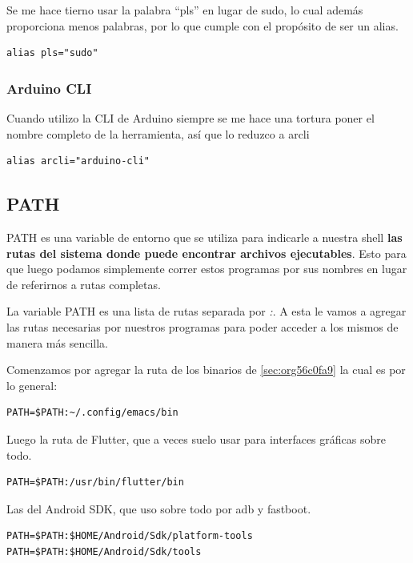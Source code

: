 \documentclass[11pt]{article}
\begin{document}
Se me hace tierno usar la palabra ``pls'' en lugar de sudo, lo cual además proporciona menos palabras, por lo que cumple con el propósito de ser un alias.

\begin{verbatim}
alias pls="sudo"
\end{verbatim}
\subsubsection{Arduino CLI}
\label{sec:org46fb6d8}

Cuando utilizo la CLI de Arduino siempre se me hace una tortura poner el nombre completo de la herramienta, así que lo reduzco a arcli

\begin{verbatim}
alias arcli="arduino-cli"

\end{verbatim}
\subsection{PATH}
\label{sec:org67d6854}

PATH es una variable de entorno que se utiliza para indicarle a nuestra shell \textbf{las rutas del sistema donde puede encontrar archivos ejecutables}. Esto para que luego podamos simplemente correr estos programas por sus nombres en lugar de referirnos a rutas completas.

La variable PATH es una lista de rutas separada por \emph{:}. A esta le vamos a agregar las rutas necesarias por nuestros programas para poder acceder a los mismos de manera más sencilla.

Comenzamos por agregar la ruta de los binarios de \ref{sec:org56c0fa9} la cual es por lo general:

\begin{verbatim}
PATH=$PATH:~/.config/emacs/bin
\end{verbatim}

Luego la ruta de Flutter, que a veces suelo usar para interfaces gráficas sobre todo.

\begin{verbatim}
PATH=$PATH:/usr/bin/flutter/bin
\end{verbatim}

Las del Android SDK, que uso sobre todo por adb y fastboot.

\begin{verbatim}
PATH=$PATH:$HOME/Android/Sdk/platform-tools
PATH=$PATH:$HOME/Android/Sdk/tools
\end{verbatim}
\end{document}
